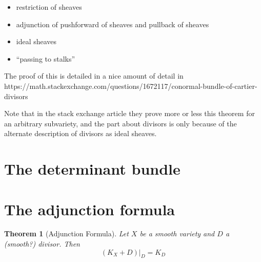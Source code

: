 \documentclass[a4paper]{article}
\newtheorem{thm}{Theorem}[section]
\begin{document}
\begin{itemize}
	\item restriction of sheaves
	\item adjunction of pushforward of sheaves and pullback of sheaves
	\item ideal sheaves
	\item ``passing to stalks''
\end{itemize}

The proof of this is detailed in a nice amount of detail in
https://math.stackexchange.com/questions/1672117/conormal-bundle-of-cartier-divisors

Note that in the stack exchange article they prove more or less this 
theorem for an arbitrary subvariety, and the part about divisors
is only because of the alternate description of divisors as ideal sheaves.

\section{The determinant bundle}


\section{The adjunction formula}


\begin{thm}[Adjunction Formula]
	Let \(X\) be a smooth variety and \(D\) a
	(smooth?) divisor. 
	Then 
	\[
		(K_{X} + D)|_{D} = K_{D}
	\] 
	
\end{thm}
\end{document}
